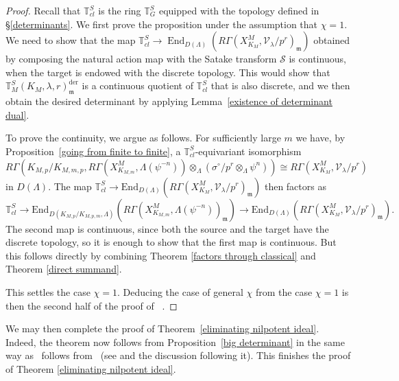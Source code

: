 \documentclass{amsart}
\theoremstyle{remark}
\numberwithin{equation}{subsection}
\newcommand{\m}{\frakm}
\newcommand{\TT}{{\mathbb T}}
\newcommand{\cS}{{\mathcal S}}
\newcommand{\cV}{{\mathcal V}}
\newcommand{\frakm}{\mathfrak{m}}
\DeclareMathOperator{\End}{End}
\renewcommand{\(}{\left(}
\renewcommand{\)}{\right)}
\begin{document}
\begin{proof} Recall that $\mathbb{T}_{cl}^S$ is the ring $\mathbb{T}_G^S$ equipped with the topology defined in \S \ref{determinants}. We first prove the proposition under the assumption that $\chi=1$. We need to show that the map $\mathbb{T}^S_{cl} \to \End_{D(\Lambda)}(R\Gamma(X_{K_M}^M, \cV_\lambda/p^r)_{\m})$ obtained by composing the natural action map with the Satake transform $\cS$ is continuous, when the target is endowed with the discrete topology. This would show that $\mathbb{T}^S_M(K_M,\lambda,r)_{\m}^{\mathrm{der}}$ is a continuous quotient of $\mathbb{T}^S_{cl}$ that is also discrete, and we then obtain the desired determinant by applying Lemma~\ref{existence of determinant dual}.

\medskip

To prove the continuity, we argue as follows. For sufficiently large $m$ we have, by Proposition~\ref{going from finite to finite}, a $\mathbb{T}^S_{cl}$-equivariant isomorphism
\[
R\Gamma\left( K_{M,p}/K_{M,m,p},R\Gamma(X_{K_{M,m}}^M, \Lambda(\psi^{-n})) \otimes_{\Lambda}(\sigma^\circ/p^r \otimes_{\Lambda}\psi^{n}) \right) \cong R\Gamma(X_{K_M}^M, \cV_\lambda/p^r)
\]
in $D(\Lambda)$. The map $\TT_{cl}^{S} \to \mathrm{End}_{D(\Lambda)}\left(R\Gamma(X_{K_M}^M, \cV_\lambda/p^r)_{\m}\right)$ then factors as  
\[
\mathbb{T}^S_{cl}\to \mathrm{End}_{D(K_{M,p}/K_{M,p,m},\Lambda)}\left(R\Gamma(X_{K_{M,m}}^M, \Lambda(\psi^{-n}))_{\m}\right)\to \mathrm{End}_{D(\Lambda)}\left(R\Gamma(X_{K_M}^M, \cV_\lambda/p^r)_{\m}\right).
\]
The second map is continuous, since both the source and the target have the discrete topology, so it is enough to show that
the first map is continuous. But this follows directly by combining Theorem \ref{factors through classical} and Theorem \ref{direct summand}.

\medskip 

This settles the case $\chi =1$. Deducing the case of general $\chi$ from the case $\chi = 1$ is then the second half of the proof of ~\cite[Prop. 5.8]{newton-thorne}. 
\end{proof}

We may then complete the proof of Theorem~\ref{eliminating nilpotent ideal}. Indeed, the theorem now follows from Proposition~\ref{big determinant} in the same way as~\cite[Thm. 1.3]{newton-thorne} follows from~\cite[Prop. 5.8]{newton-thorne} (see \cite[Theorem 5.9]{newton-thorne} and the discussion following it). This finishes the proof of Theorem \ref{eliminating nilpotent ideal}. 



\end{document}
